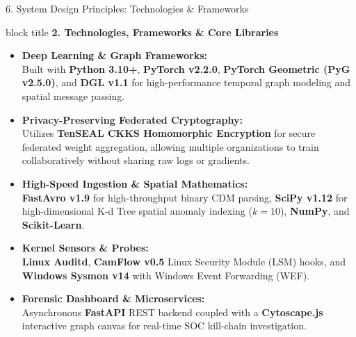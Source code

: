 \documentclass[aspectratio=169,10pt]{beamer}
\begin{document}
\begin{frame}{6. System Design Principles: Technologies \& Frameworks}
\vspace{0.2em}
\begin{beamercolorbox}[rounded=true,shadow=false,sep=0.38em,wd=\textwidth]{block title}
\textbf{\scriptsize 2. Technologies, Frameworks \& Core Libraries}
\end{beamercolorbox}
\vspace{0.2em}
{\fontsize{7.6pt}{11.0pt}\selectfont
\begin{itemize}\itemsep0.32em
  \item \textbf{Deep Learning \& Graph Frameworks:}\\
  Built with \textbf{Python 3.10+}, \textbf{PyTorch v2.2.0}, \textbf{PyTorch Geometric (PyG v2.5.0)}, and \textbf{DGL v1.1} for high-performance temporal graph modeling and spatial message passing.
  \item \textbf{Privacy-Preserving Federated Cryptography:}\\
  Utilizes \textbf{TenSEAL CKKS Homomorphic Encryption} for secure federated weight aggregation, allowing multiple organizations to train collaboratively without sharing raw logs or gradients.
  \item \textbf{High-Speed Ingestion \& Spatial Mathematics:}\\
  \textbf{FastAvro v1.9} for high-throughput binary CDM parsing, \textbf{SciPy v1.12} for high-dimensional K-d Tree spatial anomaly indexing ($k=10$), \textbf{NumPy}, and \textbf{Scikit-Learn}.
  \item \textbf{Kernel Sensors \& Probes:}\\
  \textbf{Linux Auditd}, \textbf{CamFlow v0.5} Linux Security Module (LSM) hooks, and \textbf{Windows Sysmon v14} with Windows Event Forwarding (WEF).
  \item \textbf{Forensic Dashboard \& Microservices:}\\
  Asynchronous \textbf{FastAPI} REST backend coupled with a \textbf{Cytoscape.js} interactive graph canvas for real-time SOC kill-chain investigation.
\end{itemize}
}
\end{frame}
\end{document}
